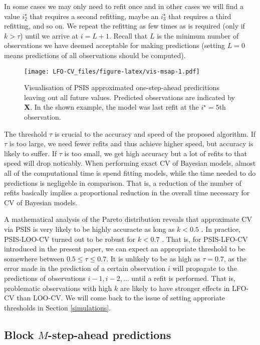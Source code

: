 \documentclass[american,]{article}
\begin{document}
In some cases we may only need to refit once and in other cases we will find a
value \(i^\star_2\) that requires a second refitting, maybe an \(i^\star_3\) that
requires a third refitting, and so on. We repeat the refitting as few times as
is required (only if \(k > \tau\)) until we arrive at \(i = L + 1\). Recall that \(L\)
is the minimum number of observations we have deemed acceptable for making
predictions (setting \(L=0\) means predictions of all observations should be
computed).

\begin{figure}
\centering
\texttt{[image: LFO-CV\_files/figure-latex/vis-msap-1.pdf]}
\caption{\label{fig:vis-msap}Visualisation of PSIS approximated one-step-ahead predicitions leaving out all future values. Predicted observations are indicated by \textbf{X}. In the shown example, the model was last refit at the \(i^\star = 5\)th observation.}
\end{figure}

The threshold \(\tau\) is crucial to the accuracy and speed of the proposed
algorithm. If \(\tau\) is too large, we need fewer refits and thus achieve higher
speed, but accuracy is likely to suffer. If \(\tau\) is too small, we get high
accuracy but a lot of refits to that speed will drop noticably. When performing
exact CV of Bayesian models, almost all of the computational time is spend
fitting models, while the time needed to do predictions is negligeble in
comparison. That is, a reduction of the number of refits basically implies a
proportional reduction in the overall time necessary for CV of Bayesian models.

A mathematical analysis of the Pareto distribution reveals that approximate CV
via PSIS is very likely to be highly accuracte as long as \(k < 0.5\)
\citep{vehtari2017psis}. In practice, PSIS-LOO-CV turned out to be robust for
\(k < 0.7\) \citep{vehtari2017loo}. That is, for PSIS-LFO-CV introduced in the
present paper, we can expect an appropriate threshold to be somewhere between
\(0.5 \leq \tau \leq 0.7\). It is unlikely to be as high as \(\tau = 0.7\), as the
error made in the prediction of a certain observation \(i\) will propagate to the
predictions of observations \(i-1, i-2, \ldots\) until a refit is performed. That
is, problematic observations with high \(k\) are likely to have stronger effects
in LFO-CV than LOO-CV. We will come back to the issue of setting approriate
thresholds in Section \ref{simulations}.

\hypertarget{approximate_blockMSAP}{%
\subsection{\texorpdfstring{Block \(M\)-step-ahead predictions}{Block M-step-ahead predictions}}\label{approximate_blockMSAP}}
\end{document}
